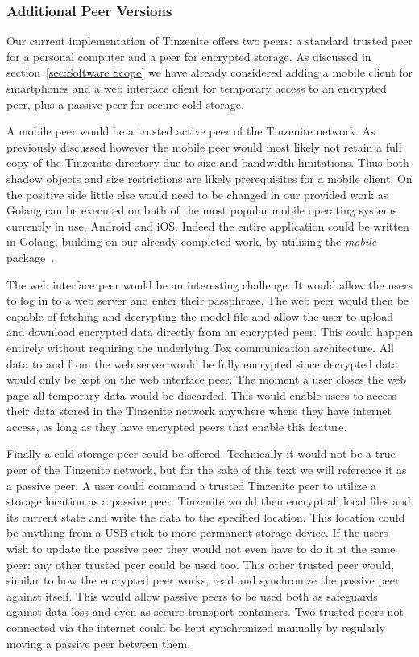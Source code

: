 \subsubsection{Additional Peer Versions}
\label{subs:Additional Peer Versions}

Our current implementation of Tinzenite offers two peers: a standard trusted peer for a personal computer and a peer for encrypted storage.
As discussed in section~\ref{sec:Software Scope} we have already considered adding a mobile client for smartphones and a web interface client for temporary access to an encrypted peer, plus a passive peer for secure cold storage.

A mobile peer would be a trusted active peer of the Tinzenite network.
As previously discussed however the mobile peer would most likely not retain a full copy of the Tinzenite directory due to size and bandwidth limitations.
Thus both shadow objects and size restrictions are likely prerequisites for a mobile client.
On the positive side little else would need to be changed in our provided work as Golang can be executed on both of the most popular mobile operating systems currently in use, Android and iOS.
Indeed the entire application could be written in Golang, building on our already completed work, by utilizing the \emph{mobile} package~\cite{web:site:golang:mobile}.

The web interface peer would be an interesting challenge.
It would allow the users to log in to a web server and enter their passphrase.
The web peer would then be capable of fetching and decrypting the model file and allow the user to upload and download encrypted data directly from an encrypted peer.
This could happen entirely without requiring the underlying Tox communication architecture.
All data to and from the web server would be fully encrypted since decrypted data would only be kept on the web interface peer.
The moment a user closes the web page all temporary data would be discarded.
This would enable users to access their data stored in the Tinzenite network anywhere where they have internet access, as long as they have encrypted peers that enable this feature.

Finally a cold storage peer could be offered.
Technically it would not be a true peer of the Tinzenite network, but for the sake of this text we will reference it as a passive peer.
A user could command a trusted Tinzenite peer to utilize a storage location as a passive peer.
Tinzenite would then encrypt all local files and its current state and write the data to the specified location.
This location could be anything from a USB stick to more permanent storage device.
If the users wish to update the passive peer they would not even have to do it at the same peer: any other trusted peer could be used too.
This other trusted peer would, similar to how the encrypted peer works, read and synchronize the passive peer against itself.
This would allow passive peers to be used both as safeguards against data loss and even as secure transport containers.
Two trusted peers not connected via the internet could be kept synchronized manually by regularly moving a passive peer between them.


